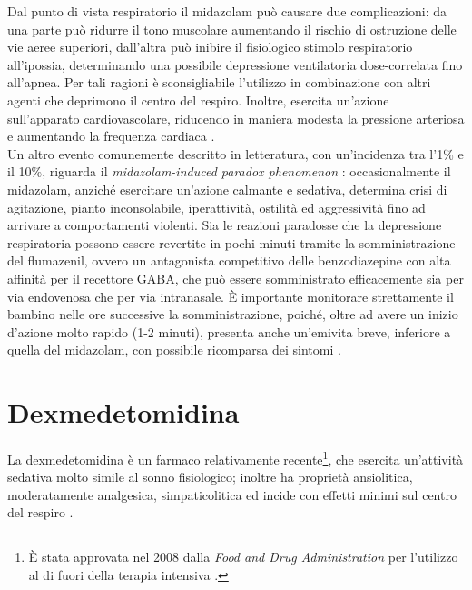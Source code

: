 Dal punto di vista respiratorio il midazolam può causare due complicazioni: da una parte può ridurre il tono muscolare aumentando il rischio di ostruzione delle vie aeree superiori, dall'altra può inibire il fisiologico stimolo respiratorio all'ipossia, determinando una possibile depressione ventilatoria dose-correlata fino all'apnea. Per tali ragioni è sconsigliabile l'utilizzo in combinazione con altri agenti che deprimono il centro del respiro. 
Inoltre, esercita un'azione sull'apparato cardiovascolare, riducendo in maniera modesta la pressione arteriosa e aumentando la frequenza cardiaca \cite{Olkkola2008}. 
\\Un altro evento comunemente descritto in letteratura, con un'incidenza tra l'1$\%$ e il 10$\%$, riguarda il \emph{midazolam-induced paradox phenomenon} \cite{Weinbroum2001}: occasionalmente il midazolam, anziché esercitare un'azione calmante e sedativa, determina crisi di agitazione, pianto inconsolabile, iperattività, ostilità ed aggressività fino ad arrivare a comportamenti violenti. Sia le reazioni paradosse che la depressione respiratoria possono essere revertite in pochi minuti tramite la somministrazione del flumazenil, ovvero un antagonista competitivo delle benzodiazepine con alta affinità per il recettore GABA, che può essere somministrato efficacemente sia per via endovenosa che per via intranasale. \`E importante monitorare strettamente il bambino nelle ore successive la somministrazione, poiché, oltre ad avere un inizio d'azione molto rapido (1-2 minuti), presenta anche un'emivita breve, inferiore a quella del midazolam, con possibile ricomparsa dei sintomi \cite{Simeupsedazione, Uptodatepharmacology}.


\section{Dexmedetomidina}

La dexmedetomidina è un farmaco relativamente recente\footnote{\`E stata approvata nel 2008 dalla \emph{Food and Drug Administration} per l'utilizzo al di fuori della terapia intensiva \cite{Simeupsedazione, Uptodatepharmacology}.}, che esercita un'attività sedativa molto simile al sonno fisiologico; inoltre ha proprietà ansiolitica, moderatamente analgesica, simpaticolitica ed incide con effetti minimi sul centro del respiro \cite{Mahmoud2015}.

 
